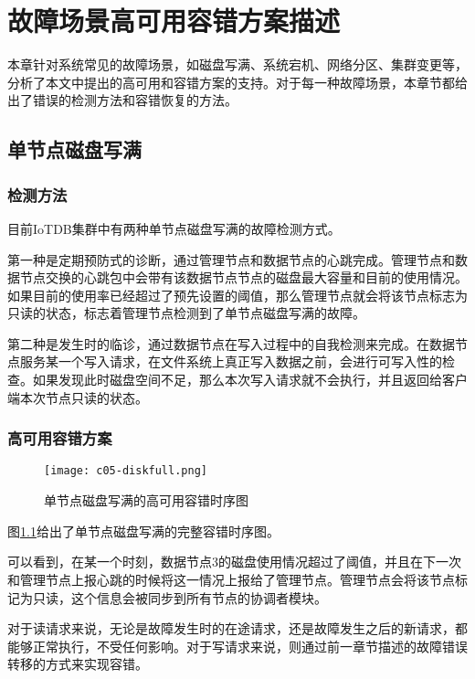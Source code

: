 
\chapter{故障场景高可用容错方案描述}\label{chap-failure-scenarios}

本章针对系统常见的故障场景，如磁盘写满、系统宕机、网络分区、集群变更等，分析了本文中提出的高可用和容错方案的支持。对于每一种故障场景，本章节都给出了错误的检测方法和容错恢复的方法。


\section{单节点磁盘写满}

\subsection{检测方法}

目前IoTDB集群中有两种单节点磁盘写满的故障检测方式。

第一种是定期预防式的诊断，通过管理节点和数据节点的心跳完成。管理节点和数据节点交换的心跳包中会带有该数据节点节点的磁盘最大容量和目前的使用情况。如果目前的使用率已经超过了预先设置的阈值，那么管理节点就会将该节点标志为只读的状态，标志着管理节点检测到了单节点磁盘写满的故障。

第二种是发生时的临诊，通过数据节点在写入过程中的自我检测来完成。在数据节点服务某一个写入请求，在文件系统上真正写入数据之前，会进行可写入性的检查。如果发现此时磁盘空间不足，那么本次写入请求就不会执行，并且返回给客户端本次节点只读的状态。

\subsection{高可用容错方案}

\begin{figure}
    \centering
    \texttt{[image: c05-diskfull.png]}
    \caption{单节点磁盘写满的高可用容错时序图}
    \label{fig:c05-diskfull}
  \end{figure}

图\ref{fig:c05-diskfull}给出了单节点磁盘写满的完整容错时序图。

可以看到，在某一个时刻，数据节点3的磁盘使用情况超过了阈值，并且在下一次和管理节点上报心跳的时候将这一情况上报给了管理节点。管理节点会将该节点标记为只读，这个信息会被同步到所有节点的协调者模块。

对于读请求来说，无论是故障发生时的在途请求，还是故障发生之后的新请求，都能够正常执行，不受任何影响。对于写请求来说，则通过前一章节描述的故障错误转移的方式来实现容错。

